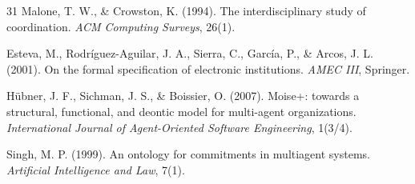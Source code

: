 \documentclass[journal]{IEEEtran}
\begin{document}
\begin{thebibliography}{31}
Malone, T. W., \& Crowston, K. (1994). The interdisciplinary study of coordination. \emph{ACM Computing Surveys}, 26(1).

Esteva, M., Rodríguez-Aguilar, J. A., Sierra, C., García, P., \& Arcos, J. L. (2001). On the formal specification of electronic institutions. \emph{AMEC III}, Springer.

Hübner, J. F., Sichman, J. S., \& Boissier, O. (2007). Moise+: towards a structural, functional, and deontic model for multi-agent organizations. \emph{International Journal of Agent-Oriented Software Engineering}, 1(3/4).

Singh, M. P. (1999). An ontology for commitments in multiagent systems. \emph{Artificial Intelligence and Law}, 7(1). 

\end{thebibliography}
\end{document}
